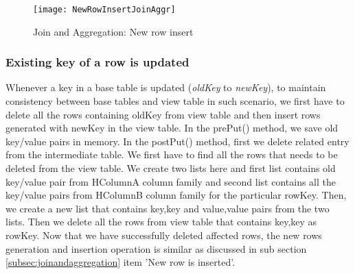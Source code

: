 \documentclass[11pt,a4paper,bibtotoc,idxtotoc,headsepline,footsepline,footexclude,BCOR12mm,DIV13]{scrbook}
\begin{document}
\begin{figure}
    \centering
    \texttt{[image: NewRowInsertJoinAggr]}
    \caption{Join and Aggregation: New row insert}
    \label{sec:insertnewrowjoinandaggr}
    
\end{figure}




\subsubsection{Existing key of a row is updated}

Whenever a key in a base table is updated (\emph{oldKey} to \emph{newKey}), to maintain consistency between base tables and view table in such scenario, we first have to delete all the rows containing oldKey from view table and then insert rows generated with newKey in the view table. In the prePut()
 method, we save old key/value pairs in memory. In the postPut() method, first we delete related entry from the intermediate table. We first have to find all the rows that needs to be deleted from the view table. We create two lists here and first list contains old key/value pair from HColumnA column family and second list contains all the key/value pairs from HColumnB column family for the particular rowKey. Then, we create a new list that contains key,key and value,value pairs from the two lists. Then we delete all the rows from view table that contains key,key as rowKey. Now that we have successfully deleted affected rows, the new rows generation and insertion operation is similar as discussed in sub section \ref{subsec:joinandaggregation} item 'New row is inserted'.
 
\end{document}
